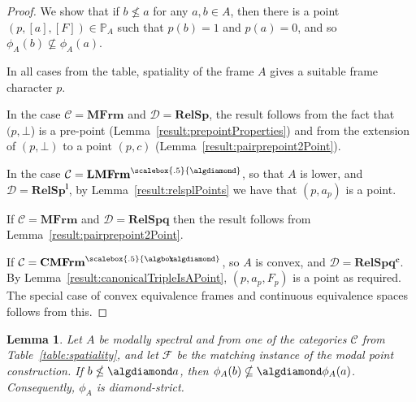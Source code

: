 \documentclass{article}[a4paper]
\newtheorem{lemma}{Lemma}%
\theoremstyle{definition}
\newcommand{\Ccal}{\mathcal{C}} %
\newcommand{\Dcal}{\mathcal{D}} %
\newcommand{\Fcal}{\mathcal{F}} %
\newcommand{\relsp}{\mathbf{RelSp}}
\newcommand{\relspl}{\mathbf{RelSp^l}}
\newcommand{\relspq}{\mathbf{RelSpq}}
\newcommand{\relspqc}{\mathbf{RelSpq^c}}
\newcommand{\mfrm}{\mathbf{MFrm}}
\newcommand{\lmfrmds}{\mathbf{LMFrm}^{\scalebox{.5}{\algdiamond}}}
\newcommand{\cmfrms}{\mathbf{CMFrm}^{\scalebox{.5}{\algbox\!\!\!\algdiamond}}}
\newcommand{\Pbb}{\mathbb{P}}
\begin{document}
\begin{proof}
We show that if $b \nleq a$ for any $a,b \in A$, then there is a point $(p,[a],[F]) \in \Pbb_A$ such that $p(b)=1$ and $p(a) =0$, and so $\phi_A (b) \nsubseteq \phi_A (a)$. 

In all cases from the table, spatiality of the frame $A$ gives a suitable frame character $p$.

    In the case $\Ccal = \mfrm$ and $\Dcal = \relsp$, the result follows from the fact that $(p,\bot$) is a pre-point (Lemma~\ref{result:prepointProperties}) and from the extension of $(p,\bot)$ to a point $(p,c)$ (Lemma~\ref{result:pairprepoint2Point}). 

In the case $\Ccal = \lmfrmds$, so that  $A$ is lower, and $\Dcal = \relspl$, by Lemma~\ref{result:relsplPoints} we have that  $(p,a_p)$ is a point. 

If $\Ccal = \mfrm$ and 
$\Dcal = \relspq$ then the result follows from  Lemma~\ref{result:pairprepoint2Point}.

If $\Ccal = \cmfrms$, so $A$ is convex, and $\Dcal = \relspqc$. By Lemma~\ref{result:canonicalTripleIsAPoint}, $(p,a_p,F_p)$ is a point as required. The special case of convex equivalence frames and continuous equivalence spaces follows from this.
\end{proof}

\begin{lemma}
    Let $A$ be modally spectral and from one of the categories $\Ccal$ from Table~\ref{table:spatiality}, and let $\Fcal$ be the matching instance of the modal point construction.  If $b\nleq \algdiamond a$, then $\phi_A(b) \nsubseteq \algdiamond \phi_A(a)$. Consequently, $\phi_A$ is diamond-strict. 
\end{lemma}
\end{document}
